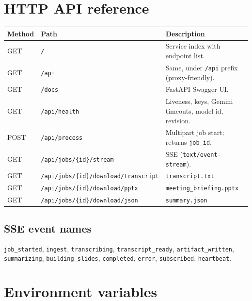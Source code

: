 \documentclass[11pt,a4paper]{article}
\begin{document}
\section{HTTP API reference}

\begin{longtable}{@{}llp{7.2cm}@{}}
  \toprule
  \textbf{Method} & \textbf{Path} & \textbf{Description} \\
  \midrule
  \endhead
  GET & \texttt{/} & Service index with endpoint list. \\
  GET & \texttt{/api} & Same, under \texttt{/api} prefix (proxy-friendly). \\
  GET & \texttt{/docs} & FastAPI Swagger UI. \\
  GET & \texttt{/api/health} & Liveness, keys, Gemini timeouts, model id, revision. \\
  POST & \texttt{/api/process} & Multipart job start; returns \texttt{job\_id}. \\
  GET & \texttt{/api/jobs/\{id\}/stream} & SSE (\texttt{text/event-stream}). \\
  GET & \texttt{/api/jobs/\{id\}/download/transcript} & \texttt{transcript.txt} \\
  GET & \texttt{/api/jobs/\{id\}/download/pptx} & \texttt{meeting\_briefing.pptx} \\
  GET & \texttt{/api/jobs/\{id\}/download/json} & \texttt{summary.json} \\
  \bottomrule
\end{longtable}

\subsection{SSE event names}
\texttt{job\_started}, \texttt{ingest}, \texttt{transcribing}, \texttt{transcript\_ready}, \texttt{artifact\_written}, \texttt{summarizing}, \texttt{building\_slides}, \texttt{completed}, \texttt{error}, \texttt{subscribed}, \texttt{heartbeat}.

\section{Environment variables}
\end{document}
